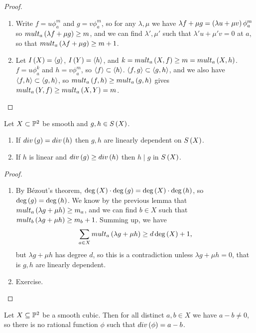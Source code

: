 \begin{proof}
\hfill
\begin{enumerate}
\item Write $ f = u\phi_a^m $ and $ g = v\phi_a^m $, so for any $ \lambda, \mu $ we have $ \lambda f + \mu g = \rb{\lambda u + \mu v}\phi_a^m $ so $ mult_a\rb{\lambda f + \mu g} \ge m $, and we can find $ \lambda', \mu' $ such that $ \lambda'u + \mu'v = 0 $ at $ a $, so that $ mult_a\rb{\lambda f + \mu g} \ge m + 1 $.
\item Let $ I\rb{X} = \ab{g} $, $ I\rb{Y} = \ab{h} $, and $ k = mult_a\rb{X, f} \ge m = mult_a\rb{X, h} $. $ f = u\phi_a^k $ and $ h = v\phi_a^m $, so $ \ab{f} \subset \ab{h} $. $ \ab{f, g} \subset \ab{g, h} $, and we also have $ \ab{f, h} \subset \ab{g, h} $, so $ mult_a\rb{f, h} \ge mult_a\rb{g, h} $ gives $ mult_a\rb{Y, f} \ge mult_a\rb{X, Y} = m $.
\end{enumerate}
\end{proof}

\pagebreak

\begin{lemma}
Let $ X \subset \P^2 $ be smooth and $ g, h \in S\rb{X} $.
\begin{enumerate}
\item If $ div\rb{g} = div\rb{h} $ then $ g, h $ are linearly dependent on $ S\rb{X} $.
\item If $ h $ is linear and $ div\rb{g} \ge div\rb{h} $ then $ h \mid g $ in $ S\rb{X} $.
\end{enumerate}
\end{lemma}

\begin{proof}
\hfill
\begin{enumerate}
\item By B\'ezout's theorem, $ \deg\rb{X} \cdot \deg\rb{g} = \deg\rb{X} \cdot \deg\rb{h} $, so $ \deg\rb{g} = \deg\rb{h} $. We know by the previous lemma that $ mult_a\rb{\lambda g + \mu h} \ge m_a $, and we can find $ b \in X $ such that $ mult_b\rb{\lambda g + \mu h} \ge m_b + 1 $. Summing up, we have
$$ \sum_{a \in X} mult_a\rb{\lambda g + \mu h} \ge d\deg\rb{X} + 1, $$
but $ \lambda g + \mu h $ has degree $ d $, so this is a contradiction unless $ \lambda g + \mu h = 0 $, that is $ g, h $ are linearly dependent.
\item Exercise.
\end{enumerate}
\end{proof}

\begin{proposition}
Let $ X \subseteq \P^2 $ be a smooth cubic. Then for all distinct $ a, b \in X $ we have $ a - b \ne 0 $, so there is no rational function $ \phi $ such that $ div\rb{\phi} = a - b $.
\end{proposition}


